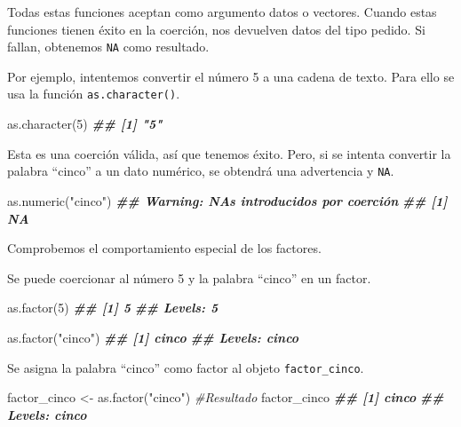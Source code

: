 \documentclass[
]{book}
\newenvironment{Shaded}{\begin{snugshade}}{\end{snugshade}}
\newcommand{\CommentTok}[1]{\textcolor[rgb]{0.56,0.35,0.01}{\textit{#1}}}
\newcommand{\DecValTok}[1]{\textcolor[rgb]{0.00,0.00,0.81}{#1}}
\newcommand{\DocumentationTok}[1]{\textcolor[rgb]{0.56,0.35,0.01}{\textbf{\textit{#1}}}}
\newcommand{\FunctionTok}[1]{\textcolor[rgb]{0.00,0.00,0.00}{#1}}
\newcommand{\NormalTok}[1]{#1}
\newcommand{\OtherTok}[1]{\textcolor[rgb]{0.56,0.35,0.01}{#1}}
\newcommand{\StringTok}[1]{\textcolor[rgb]{0.31,0.60,0.02}{#1}}
\begin{document}
Todas estas funciones aceptan como argumento datos o vectores. Cuando estas funciones tienen éxito en la coerción, nos devuelven datos del tipo pedido. Si fallan, obtenemos \texttt{NA} como resultado.

Por ejemplo, intentemos convertir el número 5 a una cadena de texto. Para ello se usa la función \texttt{as.character()}.

\begin{Shaded}
\begin{Highlighting}[]
\FunctionTok{as.character}\NormalTok{(}\DecValTok{5}\NormalTok{)}
\DocumentationTok{\#\# [1] "5"}
\end{Highlighting}
\end{Shaded}

Esta es una coerción válida, así que tenemos éxito. Pero, si se intenta convertir la palabra ``cinco'' a un dato numérico, se obtendrá una advertencia y \texttt{NA}.

\begin{Shaded}
\begin{Highlighting}[]
\FunctionTok{as.numeric}\NormalTok{(}\StringTok{"cinco"}\NormalTok{)}
\DocumentationTok{\#\# Warning: NAs introducidos por coerción}
\DocumentationTok{\#\# [1] NA}
\end{Highlighting}
\end{Shaded}

Comprobemos el comportamiento especial de los factores.

Se puede coercionar al número 5 y la palabra ``cinco'' en un factor.

\begin{Shaded}
\begin{Highlighting}[]
\FunctionTok{as.factor}\NormalTok{(}\DecValTok{5}\NormalTok{)}
\DocumentationTok{\#\# [1] 5}
\DocumentationTok{\#\# Levels: 5}

\FunctionTok{as.factor}\NormalTok{(}\StringTok{"cinco"}\NormalTok{)}
\DocumentationTok{\#\# [1] cinco}
\DocumentationTok{\#\# Levels: cinco}
\end{Highlighting}
\end{Shaded}

Se asigna la palabra ``cinco'' como factor al objeto \texttt{factor\_cinco}.

\begin{Shaded}
\begin{Highlighting}[]
\NormalTok{factor\_cinco }\OtherTok{\textless{}{-}} \FunctionTok{as.factor}\NormalTok{(}\StringTok{"cinco"}\NormalTok{)}
\CommentTok{\#Resultado}
\NormalTok{factor\_cinco}
\DocumentationTok{\#\# [1] cinco}
\DocumentationTok{\#\# Levels: cinco}
\end{Highlighting}
\end{Shaded}
\end{document}
